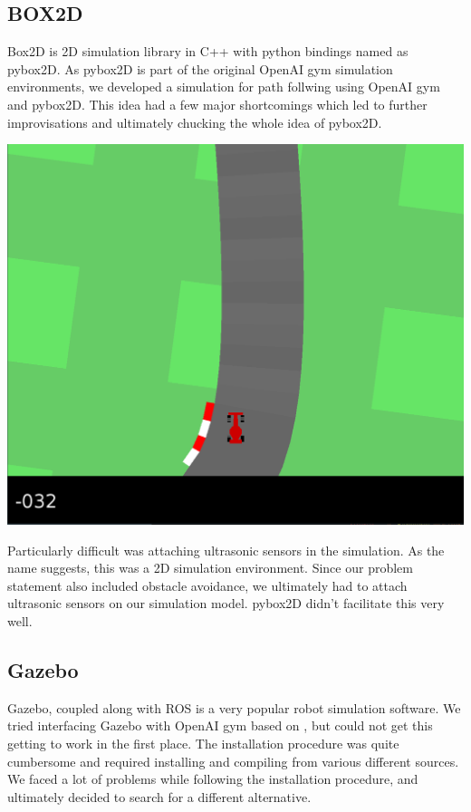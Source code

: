 \documentclass[12pt]{extreport}
\theoremstyle{plain}
\theoremstyle{definition}
\begin{document}
\subsection{BOX2D}
Box2D is 2D simulation library in C++ with python bindings named as pybox2D. As pybox2D is part of the original OpenAI gym simulation environments, we developed a simulation for path follwing using OpenAI gym and pybox2D. This idea had a few major shortcomings which led to further improvisations and ultimately chucking the whole idea of pybox2D.

\begin{center}
    \includegraphics[width=0.8\linewidth]{1.png}
\end{center}

Particularly difficult was attaching ultrasonic sensors in the simulation. As the name suggests, this was a 2D simulation environment. Since our problem statement also included obstacle avoidance, we ultimately had to attach ultrasonic sensors on our simulation model. pybox2D didn't facilitate this very well.

\subsection{Gazebo}
Gazebo, \cite{gazebo} coupled along with ROS \cite{ros} is a very popular robot simulation software. We tried interfacing Gazebo with OpenAI gym based on \cite{gym-gazebo}, but could not get this getting to work in the first place. The installation procedure was quite cumbersome and required installing and compiling from various different sources. We faced a lot of problems while following the installation procedure, and ultimately decided to search for a different alternative.
\end{document}
